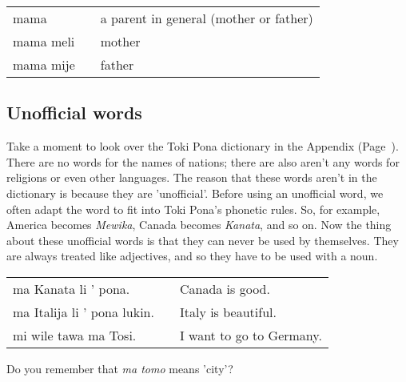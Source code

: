 \begin{supertabular}{p{5,5cm}|ll}
mama && a parent in general (mother or father) \\
mama meli && mother \\
mama mije && father \\
\end{supertabular} 

%
\subsection*{Unofficial words}
%
Take a moment to look over the Toki Pona dictionary in the Appendix (Page~\pageref{'unofficial_words'}). 
There are no words for the names of nations; there are also aren't any words for religions or even other languages. 
The reason that these words aren't in the dictionary is because they are 'unofficial'. 
Before using an unofficial word, we often adapt the word to fit into Toki Pona's phonetic rules. 
So, for example, America becomes \textit{Mewika}, Canada becomes \textit{Kanata}, and so on. 
Now the thing about these unofficial words is that they can never be used by themselves. 
They are always treated like adjectives, and so they have to be used with a noun. 

\begin{supertabular}{p{5,5cm}|ll}
ma Kanata li ' pona. && Canada is good. \\
ma Italija li ' pona lukin. && Italy is beautiful. \\
mi wile tawa ma Tosi. && I want to go to Germany. \\
\end{supertabular} 

Do you remember that \textit{ma tomo} means 'city'? 

